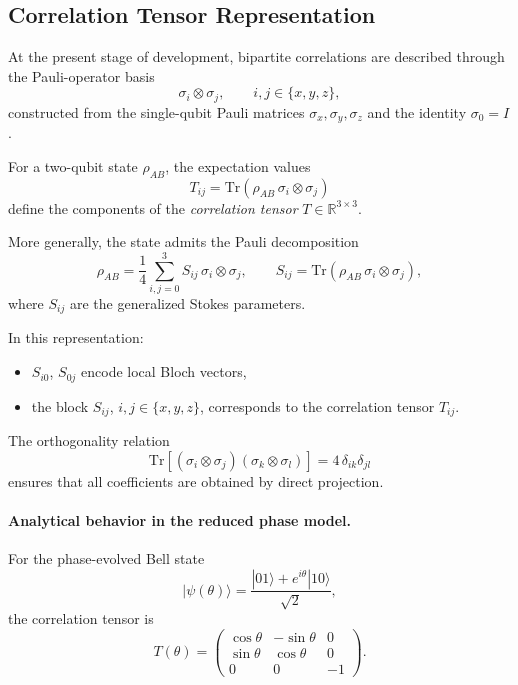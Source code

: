 \documentclass[a4paper]{article}
\begin{document}
\subsection{Correlation Tensor Representation}

At the present stage of development, bipartite correlations are described through the Pauli-operator basis
\[
\sigma_i \otimes \sigma_j,
\qquad i,j \in \{x,y,z\},
\]
constructed from the single-qubit Pauli matrices \( \sigma_x, \sigma_y, \sigma_z \) and the identity \( \sigma_0 = I \).

\medskip

For a two-qubit state \( \rho_{AB} \), the expectation values
\[
T_{ij}
=
\mathrm{Tr}\!\left(\rho_{AB}\, \sigma_i \otimes \sigma_j\right)
\]
define the components of the \emph{correlation tensor} \( T \in \mathbb{R}^{3 \times 3} \).

\medskip

More generally, the state admits the Pauli decomposition
\[
\rho_{AB}
=
\frac{1}{4}
\sum_{i,j=0}^{3}
S_{ij}\, \sigma_i \otimes \sigma_j,
\qquad
S_{ij}
=
\mathrm{Tr}\!\left(\rho_{AB}\, \sigma_i \otimes \sigma_j\right),
\]
where \( S_{ij} \) are the generalized Stokes parameters.

In this representation:
\begin{itemize}
\item \( S_{i0} \), \( S_{0j} \) encode local Bloch vectors,
\item the block \( S_{ij} \), \( i,j \in \{x,y,z\} \), corresponds to the correlation tensor \( T_{ij} \).
\end{itemize}

\medskip

The orthogonality relation
\[
\mathrm{Tr}\!\left[(\sigma_i \otimes \sigma_j)(\sigma_k \otimes \sigma_l)\right]
=
4\,\delta_{ik}\delta_{jl}
\]
ensures that all coefficients are obtained by direct projection.

\medskip

\paragraph{Analytical behavior in the reduced phase model.}

For the phase-evolved Bell state
\[
|\psi(\theta)\rangle
=
\frac{|01\rangle + e^{i\theta}|10\rangle}{\sqrt{2}},
\]
the correlation tensor is
\[
T(\theta)
=
\begin{pmatrix}
\cos\theta & -\sin\theta & 0\\
\sin\theta & \cos\theta & 0\\
0 & 0 & -1
\end{pmatrix}.
\]
\end{document}

